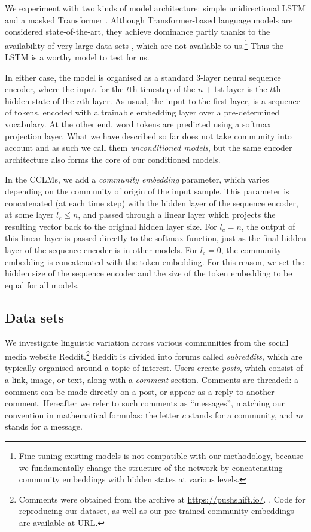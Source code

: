 \documentclass[11pt]{article}
\begin{document}
We experiment with two kinds of model architecture: simple
unidirectional LSTM \citep{Hochreiter1997} and a masked Transformer
\citep{Vaswani2017}. Although Transformer-based language models are considered
state-of-the-art, they achieve dominance partly thanks to the
availability of very large data sets \citep[e.g.,][]{Devlin2019,Brown2020},
which are not available to us.\footnote{Fine-tuning existing models
  is not compatible with our methodology, because we fundamentally
  change the structure of the network by concatenating
  community embeddings with hidden states at various levels.} Thus the LSTM is a worthy model to test for us.

In either case, the model is organised as a
standard $3$-layer neural sequence encoder, where the input for the
$t$th timestep of the $n+1$st layer is the $t$th hidden state of the 
$n$th layer.
As usual, the input to the first layer, is a sequence of tokens,
encoded with a trainable embedding layer over a pre-determined vocabulary.
At the other end, word tokens are predicted using a softmax projection 
layer. What we have described so far does not take community into account
and as such we call them \emph{unconditioned models}, but the same
encoder architecture also forms the core of our conditioned models.

In the CCLMs, we add a \emph{community embedding} parameter, 
which varies depending on the community of origin of the input sample. 
This parameter is concatenated (at each time step) with the hidden layer of the
sequence encoder, at some layer $l_c \leq n$, and passed through a
linear layer which projects the resulting vector back to the original
hidden layer size.  For $l_c = n$, the output of this linear layer is
passed directly to the softmax function, just as the final hidden
layer of the sequence encoder is in other models.  For $l_c=0$, the
community embedding is concatenated with the token embedding.  For
this reason, we set the hidden size of the sequence encoder and the
size of the token embedding to be equal for all models.


\subsection{Data sets}\label{sec:data}

We investigate linguistic variation across various communities 
from the social media website Reddit.\footnote{Comments were obtained
  from the archive at \url{https://pushshift.io/}.
  \cite{Baumgartner2020}. Code for reproducing our dataset, as well as
 our pre-trained community embeddings are available at URL.} %
%
Reddit is divided into forums called \textit{subreddits}, 
which are typically organised around a topic of interest. 
Users create \textit{posts}, which consist of a link, image, 
or text, along with a \emph{comment} section. 
Comments are threaded: a comment can be made directly on a post,
or appear as a reply to another comment.
%
Hereafter we refer to such comments as ``messages'', matching our
convention in mathematical formulas: the letter $c$ stands for a
community, and $m$ stands for a message.
\end{document}
